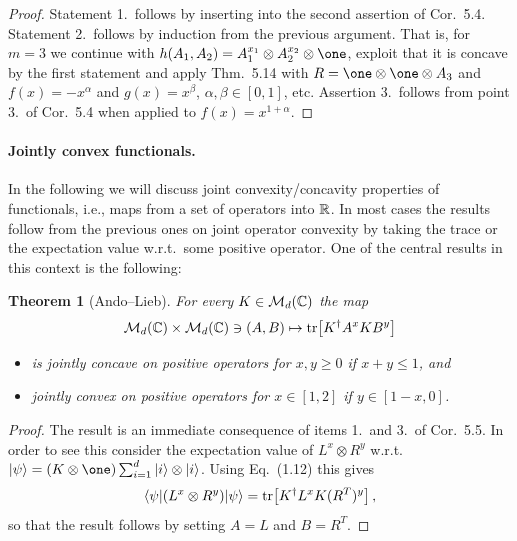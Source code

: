 \documentclass[11pt,a4paper]{article}
\theoremstyle{plain}
\newtheorem{theorem}{Theorem}[section]
\theoremstyle{definition}
\theoremstyle{remark}
\numberwithin{equation}{section}
\begin{document}
\begin{proof}
    Statement 1.\ follows by inserting into the second assertion of Cor.~5.4. Statement 2.\
    follows by induction from the previous argument. That is, for $m=3$ we continue with
    $h(A_1,A_2)=A_1^{x_1}\otimes A_2^{x_2}\otimes \one$, exploit that it is concave by the
    first statement and apply Thm.~5.14 with $R=\one\otimes \one\otimes A_3$ and
    $f(x)=-x^\alpha$ and $g(x)=x^\beta$, $\alpha,\beta\in[0,1]$, etc. Assertion 3.\ follows
    from point 3.\ of Cor.~5.4 when applied to $f(x)=x^{1+\alpha}$.
\end{proof}

\paragraph{Jointly convex functionals.}
In the following we will discuss joint convexity/concavity properties of functionals,
i.e., maps from a set of operators into $\mathbb{R}$. In most cases the results follow from
the previous ones on joint operator convexity by taking the trace or the expectation
value w.r.t.\ some positive operator. One of the central results in this context is
the following:

\begin{theorem}[Ando--Lieb]
    For every $K\in \mathcal{M}_d(\mathbb{C})$ the map
    \begin{equation}\label{eq:5.47}
        \mathcal{M}_d(\mathbb{C})\times \mathcal{M}_d(\mathbb{C})\ni (A,B) \mapsto \operatorname{tr}\!\left[K^\dagger A^x K B^y\right]
    \end{equation}
    \begin{itemize}
        \item is jointly concave on positive operators for $x,y\ge 0$ if $x+y\le 1$, and
        \item jointly convex on positive operators for $x\in[1,2]$ if $y\in[1-x,0]$.
    \end{itemize}
\end{theorem}

\begin{proof}
    The result is an immediate consequence of items 1.\ and 3.\ of Cor.~5.5. In order to
    see this consider the expectation value of $L^x\otimes R^y$ w.r.t.\
    $\ket{\psi} = (K\otimes \one)\sum_{i=1}^d \ket{i}\otimes \ket{i}$. Using Eq.~(1.12)
    this gives
    \begin{equation}\label{eq:5.48}
        \langle\psi|(L^x\otimes R^y)|\psi\rangle
        = \operatorname{tr}\!\left[K^\dagger L^x K (R^{T})^y\right],
    \end{equation}
    so that the result follows by setting $A=L$ and $B=R^{T}$.
\end{proof}
\end{document}
